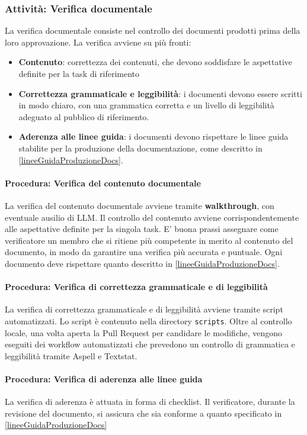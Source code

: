 \documentclass[a4paper,12pt]{article}
\begin{document}
\subsubsection{Attività: Verifica documentale}
La verifica documentale consiste nel controllo dei documenti prodotti prima
della loro approvazione. La verifica avviene su più fronti:
\begin{itemize}
    \item \textbf{Contenuto}: correttezza dei contenuti, che devono soddisfare le aspettative definite per la task di riferimento
    \item \textbf{Correttezza grammaticale e leggibilità}: i documenti devono essere scritti in modo chiaro, con una grammatica corretta e un livello di leggibilità adeguato al pubblico di riferimento.
    \item \textbf{Aderenza alle linee guida}: i documenti devono rispettare le linee guida stabilite per la produzione della documentazione, come descritto in \ref{lineeGuidaProduzioneDocs}.
\end{itemize}

\paragraph{Procedura: Verifica del contenuto documentale}
La verifica del contenuto documentale avviene tramite \textbf{walkthrough}, con
eventuale ausilio di LLM. Il controllo del contenuto avviene
corrispondentemente alle aspettative definite per la singola task. E' buona
prassi assegnare come verificatore un membro che si ritiene più competente in
merito al contenuto del documento, in modo da garantire una verifica più
accurata e puntuale. Ogni documento deve rispettare quanto descritto in
\ref{lineeGuidaProduzioneDocs}.

\paragraph{Procedura: Verifica di correttezza grammaticale e di leggibilità}
La verifica di correttezza grammaticale e di leggibilità avviene tramite script
automatizzati. Lo script è contenuto nella directory \texttt{scripts}. Oltre al
controllo locale, una volta aperta la Pull Request per candidare le modifiche,
vengono eseguiti dei workflow automatizzati che prevedono un controllo di
grammatica e leggibilità tramite Aspell e Textstat.\\

\paragraph{Procedura: Verifica di aderenza alle linee guida}
La verifica di aderenza è attuata in forma di checklist. Il verificatore, durante la revisione del documento, si assicura che sia conforme a quanto specificato in \ref{lineeGuidaProduzioneDocs}
\end{document}
